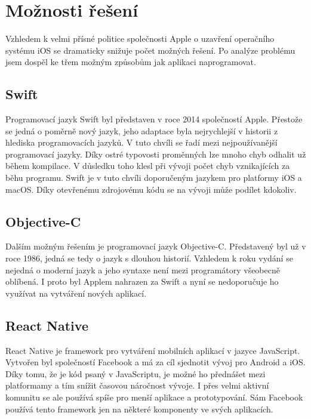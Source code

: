 \documentclass[czech]{article}
\begin{document}
\section{Možnosti řešení}

Vzhledem k velmi přísné politice společnosti Apple o uzavření operačního systému iOS se dramaticky snižuje počet možných řešení. Po analýze problému jsem dospěl ke třem možným způsobům jak aplikaci naprogramovat.

\subsection{Swift}

Programovací jazyk Swift byl představen v roce 2014 společností Apple. Přestože se jedná o poměrně nový jazyk, jeho adaptace byla nejrychlejší v historii z hlediska programovacích jazyků. V tuto chvíli se řadí mezi nejpoužívanější programovací jazyky. Díky ostré typovosti proměnných lze mnoho chyb odhalit už během kompilace. V důsledku toho klesl při vývoji počet chyb vznikajících za běhu programu. Swift je v tuto chvíli doporučeným jazykem pro platformy iOS a macOS. Díky otevřenému zdrojovému kódu se na vývoji může podílet kdokoliv.

\subsection{Objective-C}

Dalším možným řešením je programovací jazyk Objective-C. Představený byl už v roce 1986, jedná se tedy o jazyk s dlouhou historií. Vzhledem k roku vydání se nejedná o moderní jazyk a jeho syntaxe není mezi programátory všeobecně oblíbená. I proto byl Applem nahrazen za Swift a nyní se nedoporučuje ho využívat na vytváření nových aplikací.

\subsection{React Native}

React Native je framework pro vytváření mobilních aplikací v jazyce JavaScript. Vytvořen byl společností Facebook a má za cíl sjednotit vývoj pro Android a iOS. Díky tomu, že je kód psaný v JavaScriptu, je možné ho přednášet mezi platformamy a tím snížit časovou náročnost vývoje. I přes velmi aktivní komunitu se ale používá spíše pro menší aplikace a prototypování. Sám Facebook používá tento framework jen na některé komponenty ve svých aplikacích.
\end{document}
